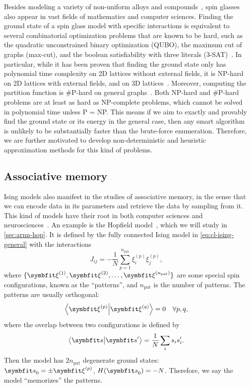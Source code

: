 Besides modeling a variety of non-uniform alloys and compounds~\cite{mydosh2015spin}, spin glasses also appear in vast fields of mathematics and computer sciences. Finding the ground state of a spin glass model with specific interactions is equivalent to several combinatorial optimization problems that are known to be hard, such as the quadratic unconstrained binary optimization (QUBO), the maximum cut of graphs (max-cut), and the boolean satisfiability with three literals (3-SAT)~\cite{karp1972reducibility}. In particular, while it has been proven that finding the ground state only has polynomial time complexity on 2D lattices without external fields, it is NP-hard on 2D lattices with external fields, and on 3D lattices~\cite{barahona1982computational}. Moreover, computing the partition function is \#P-hard on general graphs~\cite{galanis2016inapproximability, fefferman2017exact, peters2020location}. Both NP-hard and \#P-hard problems are at least as hard as NP-complete problems, which cannot be solved in polynomial time unless P = NP. This means if we aim to exactly and provably find the ground state or its energy in the general case, then any smart algorithm is unlikely to be substantially faster than the brute-force enumeration. Therefore, we are further motivated to develop non-deterministic and heuristic approximation methods for this kind of problems.

\subsection{Associative memory}
\label{sec:hopfield}

Ising models also manifest in the studies of associative memory, in the sense that we can encode data in its parameters and retrieve the data by sampling from it. This kind of models have their root in both computer sciences and neurosciences~\cite{carpenter1989neural}. An example is the Hopfield model~\cite{hopfield1982neural, amit1985spin}, which we will study in \cref{sec:arnn-hop}. It is defined by the fully connected Ising model in \cref{eq:cl-ising-general} with the interactions
\begin{equation}
J_{i j} = -\frac{1}{N} \sum_{p = 1}^{n_\text{pat}} \xi^{(p)}_i \xi^{(p)}_j,
\label{eq:hopfield}
\end{equation}
where $\{\vxi^{(1)}, \vxi^{(2)}, \ldots, \vxi^{(n_\text{pat})}\}$ are some special spin configurations, known as the ``patterns'', and $n_\text{pat}$ is the number of patterns. The patterns are usually orthogonal:
\begin{equation}
\ip{\vxi^{(p)}}{\vxi^{(q)}} = 0 \quad \forall p, q,
\label{eq:cl-ortho}
\end{equation}
where the overlap between two configurations is defined by
\begin{equation}
\ip{\vs}{\vs'} = \frac{1}{N} \sum_i s_i s'_i.
\label{eq:cl-overlap}
\end{equation}
Then the model has $2 n_\text{pat}$ degenerate ground states: $\vs_0 = \pm \vxi^{(p)}$, $H(\vs_0) = -N$. Therefore, we say the model ``memorizes'' the patterns.

